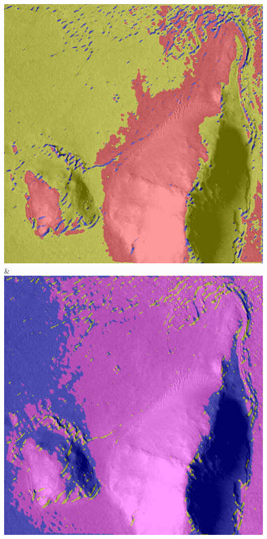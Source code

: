 \begin{table}[h!]
\begin{tabularx}{\textwidth}
		\includegraphics[width=0.9\linewidth]{images/gen/number_of_segments/p03_04.png_75.png} &
		\includegraphics[width=0.9\linewidth]{images/gen/number_of_segments/p03_04.png_100.png} \\
		\bottomrule
	\end{tabularx}
	\caption{Vergleich verschiedener Werte für die Anzahl der Cluster bei der Initialisierung. Die Farben der jeweilgen Cluster wurden zufällig gewählt.}
	\label{tab:n_segments}
\end{table}

